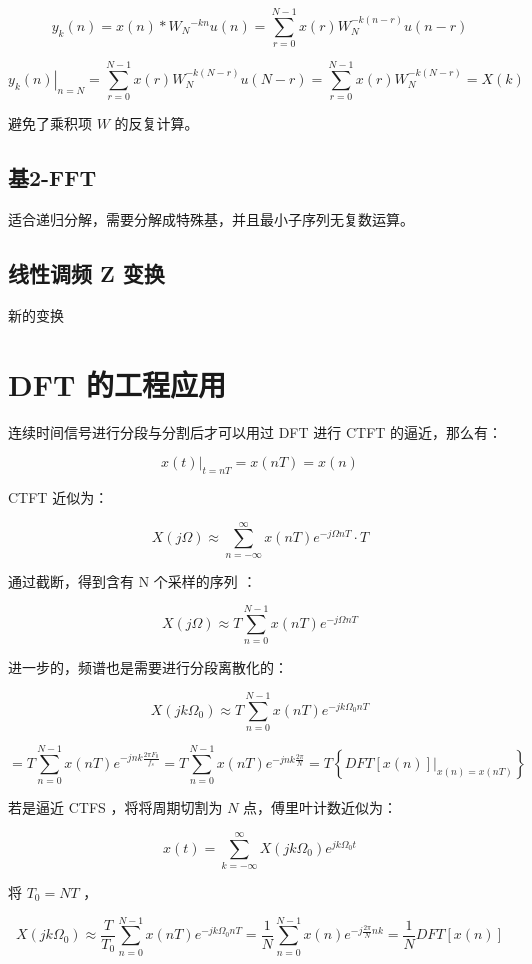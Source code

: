 \documentclass[cn,11pt,chinese,black,simple]{../elegantbook}
\begin{document}
\[y_{k}(n)=x(n) * W_{N}{ }^{-k n} u(n) = \sum_{r=0}^{N-1} x(r) W_{N}^{-k(n-r)} u(n-r)\]

\[\left.y_{k}(n)\right|_{n=N}=\sum_{r=0}^{N-1} x(r) W_{N}^{-k(N-r)} u(N-r)=\sum_{r=0}^{N-1} x(r) W_{N}^{-k(N-r)}=X(k)\]

避免了乘积项 \(W\) 的反复计算。

\subsection{基2-FFT}

适合递归分解，需要分解成特殊基，并且最小子序列无复数运算。

\subsection{线性调频 Z 变换}

新的变换

\section{DFT 的工程应用}

连续时间信号进行分段与分割后才可以用过 DFT 进行 CTFT 的逼近，那么有：

\[
\left.x(t)\right|_{t=n T}=x(n T)=x(n)
\]

CTFT 近似为：

\[
X(j \Omega) \approx \sum_{n=-\infty}^{\infty} x(n T) e^{-j \Omega n T} \cdot T
\]

通过截断，得到含有 N 个采样的序列 ：

\[
X(j \Omega) \approx T \sum_{n=0}^{N-1} x(n T) e^{-j \Omega n T}
\]

进一步的，频谱也是需要进行分段离散化的：

\[
X\left(j k \Omega_{0}\right) \approx T \sum_{n=0}^{N-1} x(n T) e^{-j k \Omega_{0} n T}
\]

\[
=T \sum_{n=0}^{N-1} x(n T) e^{-j n k \frac{2 \pi F_{0}}{f_{s}}}=T \sum_{n=0}^{N-1} x(n T) e^{-j n k \frac{2 \pi}{N}}=T\left\{\left.D F T[x(n)]\right|_{x(n)=x(n T)}\right\}
\]

若是逼近 CTFS ，将将周期切割为 \(N\) 点，傅里叶计数近似为：

\[
x(t)=\sum_{k=-\infty}^{\infty} X\left(j k \Omega_{0}\right) e^{j k \Omega_{0} t}
\]

将 \(T_0 = NT\) ，

\[
X\left(j k \Omega_{0}\right) \approx \frac{T}{T_{0}} \sum_{n=0}^{N-1} x(n T) e^{-j k \Omega_{0} n T}=\frac{1}{N} \sum_{n=0}^{N-1} x(n) e^{-j \frac{2 \pi}{N} n k}=\frac{1}{N} D F T[x(n)]
\]
\end{document}
